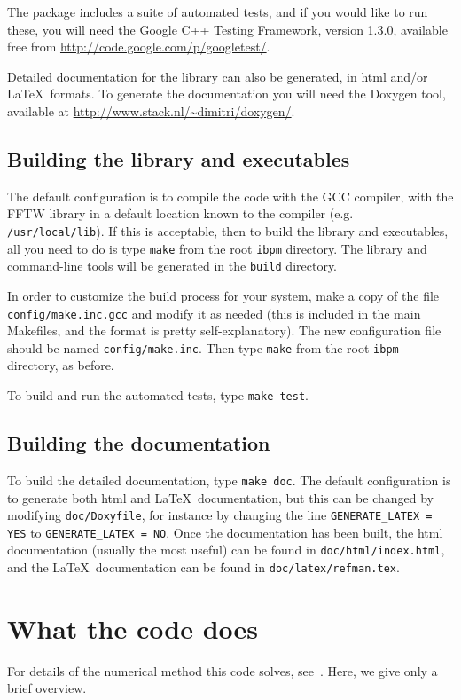 \documentclass[11pt]{article}
\begin{document}
The package includes a suite of automated tests, and if you would like to run these, you will need the Google C++ Testing Framework, version 1.3.0, available free from \url{http://code.google.com/p/googletest/}.

Detailed documentation for the library can also be generated, in html and/or \LaTeX\ formats.  To generate the documentation you will need the Doxygen tool, available at \url{http://www.stack.nl/~dimitri/doxygen/}.

\subsection{Building the library and executables}
The default configuration is to compile the code with the GCC compiler, with the FFTW library in a default location known to the compiler (e.g. {\tt /usr/local/lib}).  If this is acceptable, then to build the library and executables, all you need to do is type {\tt make} from the root {\tt ibpm} directory.  The library and command-line tools will be generated in the {\tt build} directory.

In order to customize the build process for your system, make a copy of the file {\tt config/make.inc.gcc} and modify it as needed (this is included in the main Makefiles, and the format is pretty self-explanatory).  The new configuration file should be named {\tt config/make.inc}.  Then type {\tt make} from the root {\tt ibpm} directory, as before.

To build and run the automated tests, type {\tt make test}.

\subsection{Building the documentation}
To build the detailed documentation, type {\tt make doc}.  The default configuration is to generate both html and \LaTeX\ documentation, but this can be changed by modifying {\tt doc/Doxyfile}, for instance by changing the line {\tt GENERATE\_LATEX = YES} to {\tt GENERATE\_LATEX = NO}.  Once the documentation has been built, the html documentation (usually the most useful) can be found in {\tt doc/html/index.html}, and the \LaTeX\ documentation can be found in {\tt doc/latex/refman.tex}.

\section{What the code does}
\label{sec:method}
For details of the numerical method this code solves, see~\cite{ColTai-07}.  Here, we give only a brief overview.
\end{document}
